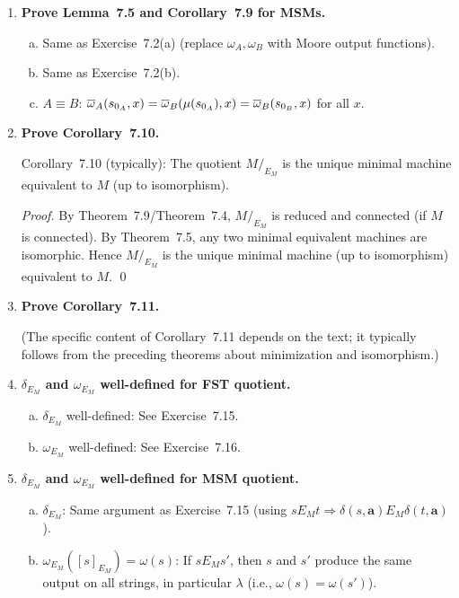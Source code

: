 \begin{enumerate}[{7.}1.]
\item \textbf{Prove Lemma~7.5 and Corollary~7.9 for MSMs.}

\begin{enumerate}[(a)]
  \item Same as Exercise~7.2(a) (replace $\omega_A,\omega_B$ with Moore output functions).
  \item Same as Exercise~7.2(b).
  \item $A\equiv B$: $\overline{\omega}_A(s_{0_A},x)=\overline{\omega}_B(\mu(s_{0_A}),x)=\overline{\omega}_B(s_{0_B},x)$ for all $x$.
\end{enumerate}

\item \textbf{Prove Corollary~7.10.}

Corollary~7.10 (typically): The quotient $M/_{E_M}$ is the unique minimal machine equivalent to $M$ (up to isomorphism).

\begin{proof}
By Theorem~7.9/Theorem~7.4, $M/_{E_M}$ is reduced and connected (if $M$ is connected).  By Theorem~7.5, any two minimal equivalent machines are isomorphic.  Hence $M/_{E_M}$ is the unique minimal machine (up to isomorphism) equivalent to $M$. \qed
\end{proof}

\item \textbf{Prove Corollary~7.11.}

(The specific content of Corollary~7.11 depends on the text; it typically follows from the preceding theorems about minimization and isomorphism.)

\item \textbf{$\delta_{E_M}$ and $\omega_{E_M}$ well-defined for FST quotient.}

\begin{enumerate}[(a)]
  \item $\delta_{E_M}$ well-defined: See Exercise~7.15.
  \item $\omega_{E_M}$ well-defined: See Exercise~7.16.
\end{enumerate}

\item \textbf{$\delta_{E_M}$ and $\omega_{E_M}$ well-defined for MSM quotient.}

\begin{enumerate}[(a)]
  \item $\delta_{E_M}$: Same argument as Exercise~7.15 (using $s E_M t\Rightarrow\delta(s,\pmb{a}) E_M \delta(t,\pmb{a})$).
  \item $\omega_{E_M}([s]_{E_M})=\omega(s)$: If $s E_M s'$, then $s$ and $s'$ produce the same output on all strings, in particular $\lambda$ (i.e., $\omega(s)=\omega(s')$).
\end{enumerate}


\end{enumerate}
